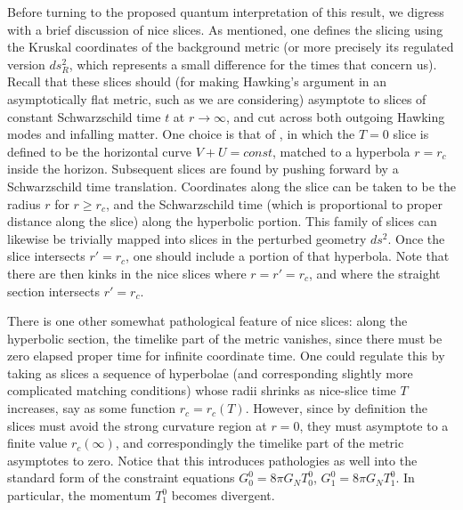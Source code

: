 Before turning to the proposed quantum interpretation of this result, we digress with a brief discussion of nice slices.  As mentioned, one defines the slicing using the Kruskal coordinates of the background metric (or more precisely its regulated version $ds_R^2$, which represents a small difference for the times that concern us).  Recall that these slices should (for making Hawking's argument in an asymptotically flat metric, such as we are considering) asymptote to slices of constant Schwarzschild time $t$ at $r\rightarrow\infty$, and cut across both  outgoing Hawking modes and infalling matter.  One choice is that of , in which the $T=0$ slice is defined to be the horizontal curve $V+U=const$, matched to a hyperbola $r=r_c$ inside the horizon.  Subsequent slices are found by pushing forward by a Schwarzschild time translation.  Coordinates along the slice can be taken to be the radius $r$ for $r\geq r_c$, and the Schwarzschild time (which is proportional to proper distance along the slice) along the hyperbolic portion.  This family of slices can likewise be trivially mapped into slices in the perturbed geometry $ds^2$.  Once the slice intersects $r'=r_c$, one should include a portion of that hyperbola.  Note that there are then kinks in the nice slices where $r=r'=r_c$, and where the straight section intersects $r'=r_c$.  

There is one other somewhat pathological feature of nice slices: along the hyperbolic section, the timelike part of the metric vanishes, since there must be zero elapsed proper time for infinite coordinate time.  One could regulate this by taking as slices a sequence of hyperbolae (and corresponding slightly more complicated matching conditions) whose radii shrinks as nice-slice time $T$ increases, say as some function $r_c=r_c(T)$.  However, since by definition the slices must avoid the strong curvature region at $r=0$, they must asymptote to a finite value $r_c(\infty)$, and correspondingly the timelike part of the metric asymptotes to zero.  Notice that this introduces pathologies as well into the standard form of the constraint equations $G^0_0 = 8\pi G_NT^0_0$, $G^0_1 = 8\pi G_NT^0_1$.  In particular, the momentum $T^0_1$ becomes divergent.  



